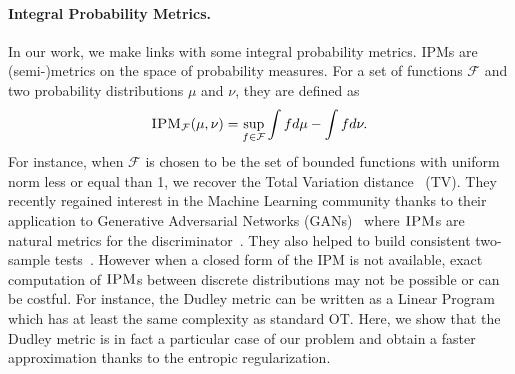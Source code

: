 \paragraph{Integral Probability Metrics. }
In our work, we make links with some integral probability metrics. IPMs are (semi-)metrics on the space of probability measures. For a set of functions $\mathcal{F}$ and two probability distributions $\mu$ and $\nu$, they are defined as $$\textsc{IPM}_\mathcal{F}(\mu,\nu)=\sup_{f\in\mathcal{F}}\int fd\mu-\int fd\nu.$$ For instance, when $\mathcal{F}$ is chosen to be the set of bounded functions with uniform norm less or equal than 1, we recover the Total Variation distance~\citep{steerneman1983total} (TV). They recently regained interest in the Machine Learning community thanks to their application to Generative Adversarial Networks (GANs)~\citep{goodfellow2014generative} where  $\textsc{IPM}$s are natural metrics  for  the discriminator~\citep{dziugaite2015training,arjovsky2017wasserstein,mroueh2017fisher,husain2019primal}. They also helped to build consistent two-sample tests~\citep{gretton2012kernel,scetbon2019comparing}. However when a closed form of the IPM is not available, exact computation of $\textsc{IPM}$s between discrete distributions may not be possible or can be costful. For instance, the Dudley metric can be written as a Linear Program~\citep{sriperumbudur2012empirical} which has at least the same complexity as standard OT. Here, we show that the Dudley metric is in fact a particular case of our problem and obtain a faster approximation thanks to the entropic regularization.






